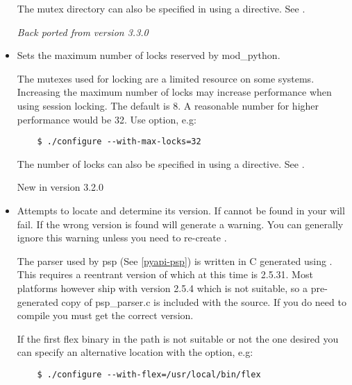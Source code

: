 \begin{itemize}
  The mutex directory can also be specified in using a 
   directive. 
  See .

  \emph{Back ported from version 3.3.0}

\item
  Sets the maximum number of locks reserved by mod_python.

  The mutexes used for locking are a limited resource on some
  systems. Increasing the maximum number of locks may increase performance
  when using session locking.  The default is 8. A reasonable number for 
  higher performance would be 32.
  Use  option, e.g:

  \begin{verbatim}
    $ ./configure --with-max-locks=32
  \end{verbatim}                      

  The number of locks can also be specified in using a 
   directive. 
  See .

  New in version 3.2.0

\item
  Attempts to locate  and determine its version. 
  If  cannot be found in your  
  will fail.  If the wrong version is found  will generate a warning.
  You can generally ignore this warning unless you need to re-create
  .
 
  The parser used by psp (See \ref{pyapi-psp}) is written in C generated using 
  . This requires a reentrant version of  which
  at this time is 2.5.31. Most platforms however ship with version 2.5.4
  which is not suitable, so a pre-generated copy of psp_parser.c is included
  with the source. If you do need to compile  you 
  must get the correct  version.
 
  If the first flex binary in the path is not suitable or not the one desired
  you can specify an alternative location with the 
  option, e.g:
 
  \begin{verbatim}
    $ ./configure --with-flex=/usr/local/bin/flex
  \end{verbatim}


\end{itemize}
